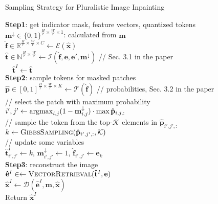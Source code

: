 \documentclass[10pt,twocolumn,letterpaper]{article}
\begin{document}
	
\begin{algorithm}[tp]
	\footnotesize
	\caption{Sampling Strategy for Pluralistic Image Inpainting}
	\label{algorithm_sampling_strategy_for_image_inpainting}
	\textbf{Step1}: get indicator mask, feature vectors, quantized tokens \\
    \quad $\mathbf{m}^{\downarrow} \in \{0,1\}^{\frac{H}{r}\times \frac{W}{r} \times 1}$: calculated from $\mathbf{m}$  \\
    \quad $\mathbf{\hat{f}} \in \mathbb{R}^{\frac{H}{r} \times \frac{W}{r} \times C} \leftarrow \mathcal{E}(\mathbf{\hat{x}})$ \\
    \quad $\mathbf{\hat{t}} \in \mathbb{N} ^{\frac{H}{r} \times \frac{W}{r}} \leftarrow \mathcal{I}(\mathbf{\hat{f}}, \mathbf{e}, \mathbf{e'}, \mathbf{m}^{\downarrow})$ // Sec. 3.1 in the paper\\
    $\quad \mathbf{\hat{t}}^{I} \leftarrow \mathbf{\hat{t}}$\\
    
	\textbf{Step2}: sample tokens for masked patches \\
	\quad {}
	{
	    $\mathbf{\hat{p}} \in [0,1]^{\frac{H}{r}\times \frac{W}{r}\times K} \leftarrow \mathcal{T}(\mathbf{\hat{f}})$ // probabilities, Sec. 3.2 in the paper\\ 
	    // select the patch with maximum probability \\
	    $i',j' \leftarrow {\rm argmax}_{i,j} (1-\mathbf{m}^{\downarrow}_{i,j}) \cdot \max \mathbf{\hat{p}}_{i,j,:}$ \\ 

	    // sample the token from the top-$\mathcal{K}$ elements in $\mathbf{\hat{p}}_{i',j',:}$ \\
	    $k \leftarrow \Call{GibbsSampling}{\mathbf{\hat{p}}_{i',j',:}, \mathcal{K}}$ \\
	    
	    // update some variables  \\
	    $\mathbf{\hat{t}}^{I}_{i',j'} \leftarrow k$,
	    $\mathbf{m}^{\downarrow}_{i',j'} \leftarrow 1$, 
	    $\mathbf{\hat{f}}_{i', j'} \leftarrow \mathbf{e}_k$ \\
	}
	\textbf{Step3}: reconstruct the image\\
    \quad $\mathbf{\hat{e}}^{I} \in \leftarrow \Call{VectorRetrieval}{\mathbf{\hat{t}}^{I}, \mathbf{e}}$\\
    \quad $\mathbf{\hat{x}}^{I} \leftarrow \mathcal{D}(\mathbf{\hat{e}}^{I}, \mathbf{m}, \mathbf{\hat{x}})$ \\
	Return $\mathbf{\hat{x}}^I$
\end{algorithm}
\end{document}
